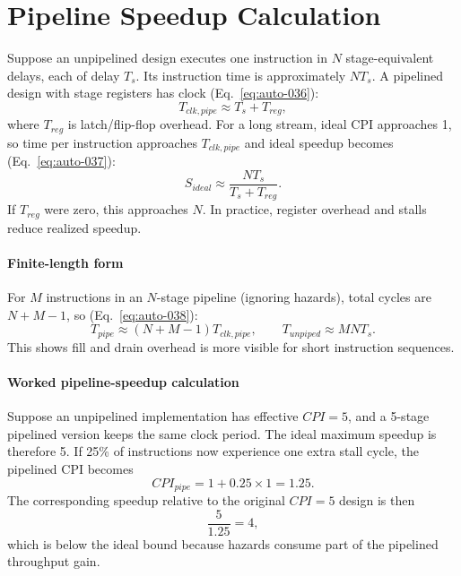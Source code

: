 \section{Pipeline Speedup Calculation}\label{sec:auto-036}
Suppose an unpipelined design executes one instruction in $N$ stage-equivalent delays, each of delay $T_s$.
Its instruction time is approximately $N T_s$.
A pipelined design with stage registers has clock (Eq.~\eqref{eq:auto-036}):
\begin{equation}\label{eq:auto-036}
    T_{clk,pipe} \approx T_s + T_{reg},
\end{equation}
where $T_{reg}$ is latch/flip-flop overhead.
For a long stream, ideal CPI approaches 1, so time per instruction approaches $T_{clk,pipe}$ and ideal speedup becomes (Eq.~\eqref{eq:auto-037}):
\begin{equation}\label{eq:auto-037}
    S_{ideal} \approx \frac{N T_s}{T_s + T_{reg}}.
\end{equation}
If $T_{reg}$ were zero, this approaches $N$.
In practice, register overhead and stalls reduce realized speedup.

\paragraph{Finite-length form}\label{par:auto-022}
For $M$ instructions in an $N$-stage pipeline (ignoring hazards), total cycles are $N+M-1$, so (Eq.~\eqref{eq:auto-038}):
\begin{equation}\label{eq:auto-038}
    T_{pipe} \approx (N+M-1)T_{clk,pipe}, \qquad
    T_{unpiped} \approx MNT_s.
\end{equation}
This shows fill and drain overhead is more visible for short instruction sequences.

\paragraph{Worked pipeline-speedup calculation}\label{par:auto-022b}
Suppose an unpipelined implementation has effective $CPI=5$, and a 5-stage pipelined version keeps the same clock period.
The ideal maximum speedup is therefore 5.
If 25\% of instructions now experience one extra stall cycle, the pipelined CPI becomes
\begin{equation}\label{eq:auto-038a}
    CPI_{pipe}=1+0.25\times 1=1.25.
\end{equation}
The corresponding speedup relative to the original $CPI=5$ design is then
\begin{equation}\label{eq:auto-038b}
    \frac{5}{1.25}=4,
\end{equation}
which is below the ideal bound because hazards consume part of the pipelined throughput gain.


